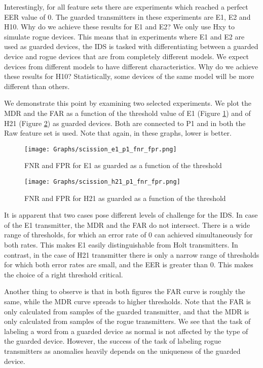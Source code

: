 \documentclass[conference]{IEEEtran}
\begin{document}
  Interestingly, for all feature sets there are experiments which reached a perfect EER value of 0. The guarded transmitters in these experiments are E1, E2 and H10. Why do we achieve these results for E1 and E2? We only use Hxy to simulate rogue devices. This means that in experiments where E1 and E2 are used as guarded devices, the IDS is tasked with differentiating between a guarded device and rogue devices that are from completely different models. We expect devices from different models to have different characteristics. Why do we achieve these results for H10? Statistically, some devices of the same model will be more different than others.
  
  We demonstrate this point by examining two selected experiments. We plot the MDR and the FAR as a function of the threshold value of E1 (Figure \ref{fig:detection_easy_example}) and of H21 (Figure \ref{fig:detection_difficult_example}) as guarded devices. Both are connected to P1 and in both the Raw feature set is used. Note that again, in these graphs, lower is better.
  
  \begin{figure}[t]
    \centering
    \texttt{[image: Graphs/scission\_e1\_p1\_fnr\_fpr.png]}
    \caption{FNR and FPR for E1 as guarded as a function of the threshold}
    \label{fig:detection_easy_example}
  \end{figure}
  
  \begin{figure}[t]
    \centering
    \texttt{[image: Graphs/scission\_h21\_p1\_fnr\_fpr.png]}
    \caption{FNR and FPR for H21 as guarded as a function of the threshold}
    \label{fig:detection_difficult_example}
  \end{figure}
  
  It is apparent that two cases pose different levels of challenge for the IDS.
  In case of the E1 transmitter, the MDR and the FAR do not intersect. There is a wide range of thresholds, for which an error rate of 0 can achieved simultaneously for both rates. This makes E1 easily distinguishable from Holt transmitters. In contrast, in the case of H21 transmitter there is only a narrow range of thresholds for which both error rates are small, and the EER is greater than 0. This makes the choice of a right threshold critical.
  
  Another thing to observe is that in both figures the FAR curve is roughly the same, while the MDR curve spreads to higher thresholds. Note that the FAR is only calculated from samples of the guarded transmitter, and that the MDR is only calculated from samples of the rogue transmitters. We see that the task of labeling a word from a guarded device as normal is not affected by the type of the guarded device. However, the success of the task of labeling rogue transmitters as anomalies heavily depends on the uniqueness of the guarded device.
   
\end{document}
